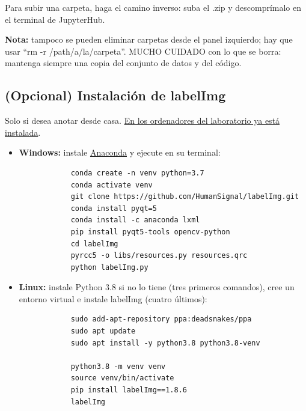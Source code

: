 \documentclass[12pt,a4paper]{article}
\begin{document}
Para subir una carpeta, haga el camino inverso: suba el .zip y descomprímalo en el terminal de JupyterHub.

\begin{framed}
    \centering
    \textbf{Nota:} tampoco se pueden eliminar carpetas desde el panel izquierdo; hay que usar ``rm -r /path/a/la/carpeta''. MUCHO CUIDADO con lo que se borra: mantenga siempre una copia del conjunto de datos y del código.
\end{framed}

\subsection{(Opcional) Instalación de labelImg}

Solo si desea anotar desde casa. \underline{En los ordenadores del laboratorio ya está instalada}.

\begin{itemize}
    \item \textbf{Windows:} instale \href{https://www.anaconda.com/download/success}{Anaconda} y ejecute en su terminal:
        \begin{verbatim}
            conda create -n venv python=3.7
            conda activate venv
            git clone https://github.com/HumanSignal/labelImg.git
            conda install pyqt=5
            conda install -c anaconda lxml
            pip install pyqt5-tools opencv-python
            cd labelImg
            pyrcc5 -o libs/resources.py resources.qrc
            python labelImg.py
        \end{verbatim}

    \item \textbf{Linux:} instale Python 3.8 si no lo tiene (tres primeros comandos), cree un entorno virtual e instale labelImg (cuatro últimos):
        \begin{verbatim}
            sudo add-apt-repository ppa:deadsnakes/ppa
            sudo apt update
            sudo apt install -y python3.8 python3.8-venv

            python3.8 -m venv venv
            source venv/bin/activate
            pip install labelImg==1.8.6
            labelImg
        \end{verbatim}
\end{itemize}
\vspace{-1cm}
\end{document}
